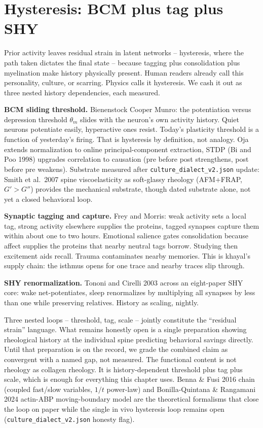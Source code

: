 \section{Hysteresis: BCM plus tag plus SHY}
\label{sec:hysteresis-cog}

Prior activity leaves residual strain in latent networks -- hysteresis, where the path taken dictates the final state -- because tagging plus consolidation plus myelination make history physically present. Human readers already call this personality, culture, or scarring. Physics calls it hysteresis. We cash it out as three nested history dependencies, each measured.

\textbf{BCM sliding threshold.} Bienenstock Cooper Munro: the potentiation versus depression threshold $\theta_m$ slides with the neuron's own activity history. Quiet neurons potentiate easily, hyperactive ones resist. Today's plasticity threshold is a function of yesterday's firing. That is hysteresis by definition, not analogy. Oja extends normalization to online principal-component extraction, STDP (Bi and Poo 1998) upgrades correlation to causation (pre before post strengthens, post before pre weakens). Substrate measured after \texttt{culture\_dialect\_v2.json} update: Smith et al.\ 2007 spine viscoelasticity as soft-glassy rheology (AFM+FRAP, $G'>G''$) provides the mechanical substrate, though dated substrate alone, not yet a closed behavioral loop.

\textbf{Synaptic tagging and capture.} Frey and Morris: weak activity sets a local tag, strong activity elsewhere supplies the proteins, tagged synapses capture them within about one to two hours. Emotional salience gates consolidation because affect supplies the proteins that nearby neutral tags borrow. Studying then excitement aids recall. Trauma contaminates nearby memories. This is khayal's supply chain: the isthmus opens for one trace and nearby traces slip through.

\textbf{SHY renormalization.} Tononi and Cirelli 2003 across an eight-paper SHY core: wake net-potentiates, sleep renormalizes by multiplying all synapses by less than one while preserving relatives. History as scaling, nightly.

Three nested loops -- threshold, tag, scale -- jointly constitute the ``residual strain'' language. What remains honestly open is a single preparation showing rheological history at the individual spine predicting behavioral savings directly. Until that preparation is on the record, we grade the combined claim as convergent with a named gap, not measured. The functional content is not rheology as collagen rheology. It is history-dependent threshold plus tag plus scale, which is enough for everything this chapter uses. Benna \& Fusi 2016 chain (coupled fast/slow variables, $1/t$ power-law) and Bonilla-Quintana \& Rangamani 2024 actin-ABP moving-boundary model are the theoretical formalisms that close the loop on paper while the single in vivo hysteresis loop remains open (\texttt{culture\_dialect\_v2.json} honesty flag).

